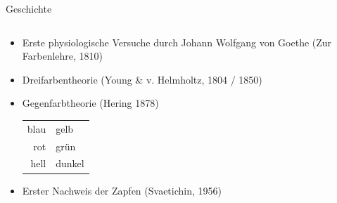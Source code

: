 \documentclass[aspectratio=1610, 9pt]{beamer}
\begin{document}
\begin{frame}[c]{Geschichte}
  \begin{columns}[onlytextwidth]
    \hfill
    \begin{column}{0.59\textwidth}
      \begin{itemize}
        \item Erste physiologische Versuche durch Johann Wolfgang von Goethe (Zur Farbenlehre, 1810) \\
        \item Dreifarbentheorie (Young \& v. Helmholtz, 1804 / 1850)
        \item Gegenfarbtheorie (Hering 1878) \\
          \begin{tabular}{r @{${}⟷  {}$} l}
            blau & gelb \\
            rot & grün \\
            hell & dunkel \\
          \end{tabular}
        \item Erster Nachweis der Zapfen (Svaetichin, 1956) 
      \end{itemize}
    \end{column}
    \hfill%
    \begin{column}{0.39\textwidth}
      \hfill%
      \vfill%
      \centering
\end{column}
\end{columns}
\end{frame}
\end{document}
